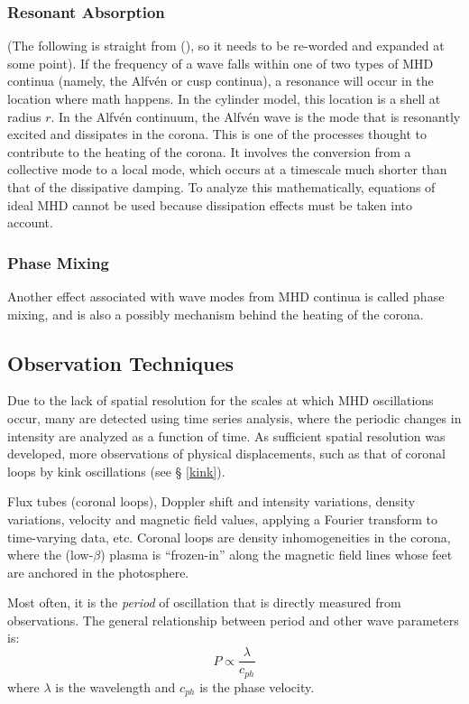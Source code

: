 \documentclass[preprint2]{aastex}
\begin{document}
\subsubsection{Resonant Absorption}
(The following is straight from (\cite{Nak}), so it needs to be
re-worded and expanded at some point).
If the frequency of a wave falls within one of two types of MHD
continua (namely, the Alfv\'en or cusp continua), a resonance will
occur in the location where math happens.
In the cylinder model, this location is a shell at radius $r$.
In the Alfv\'en continuum, the Alfv\'en wave is the mode that is
resonantly excited and dissipates in the corona.
This is one of the processes thought to contribute to the heating
of the corona. It involves the conversion from a collective mode
to a local mode, which occurs at a timescale much shorter than that
of the dissipative damping.
To analyze this mathematically, equations of ideal MHD cannot be used
because dissipation effects must be taken into account.
\subsubsection{Phase Mixing}
Another effect associated with wave modes from MHD continua is called
phase mixing, and is also a possibly mechanism behind the heating of
the corona.
\subsection{Observation Techniques}
Due to the lack of spatial resolution for the scales at which MHD
oscillations occur,
many are detected using time series analysis, where
the periodic changes in intensity are analyzed as a function of time.
As sufficient spatial resolution was developed, more observations
of physical displacements, such as that of coronal loops by kink
oscillations (see \S{} {\ref{kink}}).

Flux tubes (coronal loops), Doppler shift and intensity variations,
density variations, velocity and magnetic field values, applying
a Fourier transform to time-varying data,
etc. Coronal loops are density inhomogeneities in the corona,
where the (low-$\beta$) plasma is ``frozen-in'' along the magnetic
field lines whose feet are anchored in the photosphere.

Most often, it is the \emph{period} of oscillation that is directly
measured from observations. The general relationship between period
and other wave parameters is:
\begin{equation}
    P \propto \frac{\lambda}{c_{ph}}
\end{equation}
where $\lambda$ is the wavelength and $c_{ph}$ is the phase velocity.
\end{document}
